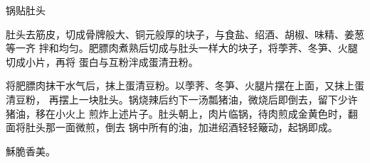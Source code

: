 \begin{recipe}{锅贴肚头}

\ingredients


\preparation

肚头去筋皮，切成骨牌般大、铜元般厚的块子，与食盐、绍酒、胡椒、味精、姜葱等一齐
拌和均匀。肥膘肉煮熟后切成与肚头一样大的块子，将荸荠、冬笋、火腿切成小片，再将
蛋白与互粉泮成蛋清丑粉。

将肥膘肉抹干水气后，抹上蛋清豆粉。以荸荠、冬笋、火腿片摆在上面，又抹上蛋清豆粉，
再摆上一块肚头。锅烧辣后约下一汤瓢猪油，微烧后即倒去，留下少许猪油，移在小火上
煎炸上述片子。肚头朝上，肉片临锅，待肉煎成金黄色时，翻面将肚头那一面微煎，倒去
锅中所有的油，加进绍酒轻轻簸动，起锅即成。

\features

穌脆香美。

\end{recipe}

